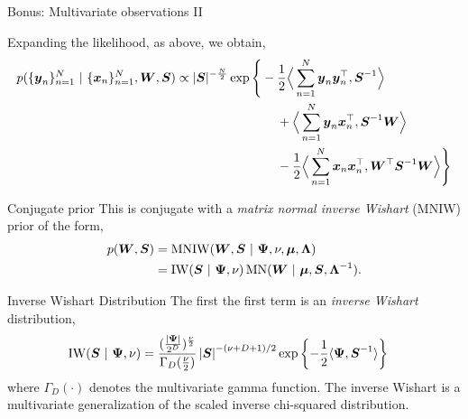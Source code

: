\documentclass[aspectratio=169]{beamer}
\begin{document}
\begin{frame}{Bonus: Multivariate observations II}

Expanding the likelihood, as above, we obtain,
\begin{align}
\nonumber
p(\{\boldsymbol{y}_n\}_{n=1}^N ~\vert~ \{\boldsymbol{x}_n\}_{n=1}^N, \boldsymbol{W}, \boldsymbol{S}) 
    &\propto |\boldsymbol{S}|^{-\frac{N}{2}} \exp \Bigg\{ 
    -\frac{1}{2} \Big \langle \sum_{n=1}^N \boldsymbol{y}_n \boldsymbol{y}_n^\top, \boldsymbol{S}^{-1} \Big \rangle \\
    \nonumber
    &\hspace{8em}
    + \Big \langle \sum_{n=1}^N \boldsymbol{y}_n \boldsymbol{x}_n^\top, \boldsymbol{S}^{-1} \boldsymbol{W} \Big \rangle 
    \\
    &\hspace{8em}
    - \frac{1}{2} \Big \langle \sum_{n=1}^N \boldsymbol{x}_n \boldsymbol{x}_n^\top, \boldsymbol{W}^\top \boldsymbol{S}^{-1} \boldsymbol{W} \Big \rangle  \Bigg \}
\end{align}

\end{frame}

\begin{frame}{Conjugate prior}
This is conjugate with a \emph{matrix normal inverse Wishart} (MNIW) prior of the form,
\begin{align}
p(\boldsymbol{W}, \boldsymbol{S}) &= \mathrm{MNIW}(\boldsymbol{W}, \boldsymbol{S} ~\vert~ \boldsymbol{\Psi}, \nu, \boldsymbol{\mu}, \boldsymbol{\Lambda}) \\
&= \mathrm{IW}(\boldsymbol{S} ~\vert~ \boldsymbol{\Psi}, \nu) \, 
\mathrm{MN}(\boldsymbol{W} ~\vert~ \boldsymbol{\mu}, \boldsymbol{S}, \boldsymbol{\Lambda}^{-1}).
\end{align}
\end{frame}

\begin{frame}{Inverse Wishart Distribution}
The first the first term is an \emph{inverse Wishart} distribution,
\begin{align}
    \mathrm{IW}(\boldsymbol{S} ~\vert~ \boldsymbol{\Psi}, \nu) &= \frac{(\frac{|\boldsymbol{\Psi}|}{2^D})^{\frac{\nu}{2}}}{\Gamma_D(\frac{\nu}{2})}
    \left|\boldsymbol{S} \right|^{-(\nu +D+1)/2} \exp \left\{-\frac{1}{2} \langle \boldsymbol{\Psi}, \boldsymbol{S}^{-1} \rangle \right\}
\end{align}
where $\Gamma_D(\cdot)$ denotes the multivariate gamma function. The inverse Wishart is a multivariate generalization of the scaled inverse chi-squared distribution.
\end{frame}
\end{document}
